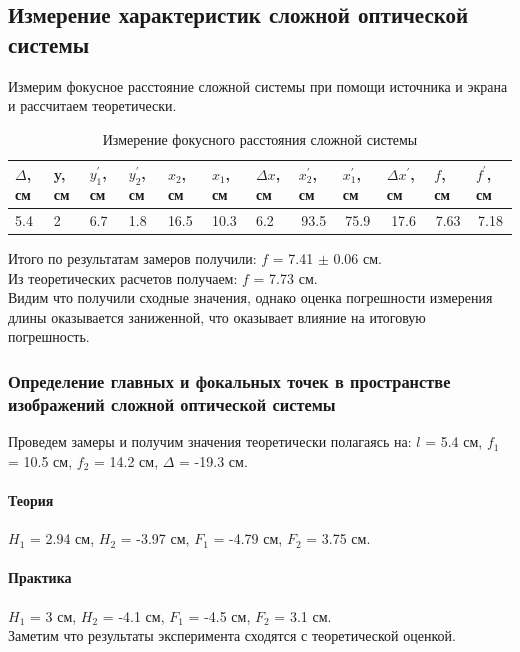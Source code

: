 \documentclass[a4paper, 12pt]{article}%
\begin{document}
	\subsection{Измерение характеристик сложной оптической системы}
	Измерим фокусное расстояние сложной системы при помощи источника и экрана и рассчитаем теоретически.
	\begin{table}[H]
		\centering
		\begin{tabular}{|l|l|l|l|l|l|l|l|l|l|l|l|}
			\hline
			$\Delta$, см&y, см   &  $y_1^\prime$, см   &    $y_2^\prime$, см   &  $x_2$, см  &  $x_1$, см   &   $\Delta x$, см                        &     $x_2^\prime$, см                      &       $x_1^\prime$, см                   &    $\Delta x^\prime$, см                       &         $f$, см & $f^\prime$, см                  \\ \hline
			5.4 & 2 & 6.7 & 1.8 & 16.5 & 10.3 & 6.2 & \multicolumn{1}{c|}{93.5} & \multicolumn{1}{c|}{75.9} & \multicolumn{1}{c|}{17.6} & \multicolumn{1}{c|}{7.63} & \multicolumn{1}{c|}{7.18} \\ \hline
		\end{tabular}
		\caption{Измерение фокусного расстояния сложной системы}
	\end{table}
	Итого по результатам замеров получили: $f$ = 7.41 $\pm$ 0.06 см.\\
	Из теоретических расчетов получаем: $f$ = 7.73 см.\\
	Видим что получили сходные значения, однако оценка погрешности измерения длины оказывается заниженной, что оказывает влияние на итоговую погрешность.
	\subsubsection{Определение главных и фокальных точек в пространстве изображений сложной оптической системы}
	Проведем замеры и получим значения теоретически полагаясь на: $l$ = 5.4 см, $f_1$ = 10.5 см, $f_2$ = 14.2 см, $\Delta$ = -19.3 см.
	\paragraph{Теория} $H_1$ = 2.94 см, $H_2$ = -3.97 см, $F_1$ = -4.79 см, $F_2$ = 3.75 см.
	\paragraph{Практика} $H_1$ = 3 см, $H_2$ = -4.1 см, $F_1$ = -4.5 см, $F_2$ = 3.1 см.\\
	Заметим что результаты эксперимента сходятся с теоретической оценкой.
\end{document}

